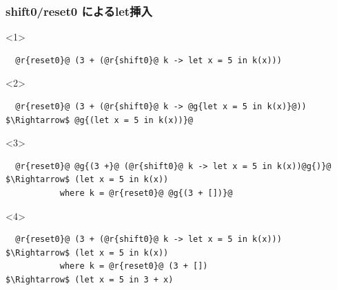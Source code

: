 \documentclass[dvipdfmx,cjk,xcolor=dvipsnames,envcountsect,notheorems,12pt,handout]{beamer} \usepackage{pgfpages} \pgfpagesuselayout{4 on 1}[a4paper,landscape,border shrink=5mm]
\theoremstyle{definition}
\begin{document}
\begin{frame}[fragile]
  \frametitle{shift0/reset0 によるlet挿入}

  \begin{onlyenv}<1>
\begin{lstlisting}
  @r{reset0}@ (3 + (@r{shift0}@ k -> let x = 5 in k(x)))
\end{lstlisting}
  \end{onlyenv}

  \begin{onlyenv}<2>
\begin{lstlisting}
  @r{reset0}@ (3 + (@r{shift0}@ k -> @g{let x = 5 in k(x)}@))
$\Rightarrow$ @g{(let x = 5 in k(x))}@
\end{lstlisting}
  \end{onlyenv}

  \begin{onlyenv}<3>
\begin{lstlisting}
  @r{reset0}@ @g{(3 +}@ (@r{shift0}@ k -> let x = 5 in k(x))@g{)}@
$\Rightarrow$ (let x = 5 in k(x))
           where k = @r{reset0}@ @g{(3 + [])}@

\end{lstlisting}
  \end{onlyenv}

  \begin{onlyenv}<4>
\begin{lstlisting}
  @r{reset0}@ (3 + (@r{shift0}@ k -> let x = 5 in k(x)))
$\Rightarrow$ (let x = 5 in k(x))
           where k = @r{reset0}@ (3 + [])
$\Rightarrow$ (let x = 5 in 3 + x)
\end{lstlisting}
  \end{onlyenv}


\end{frame}
\end{document}
